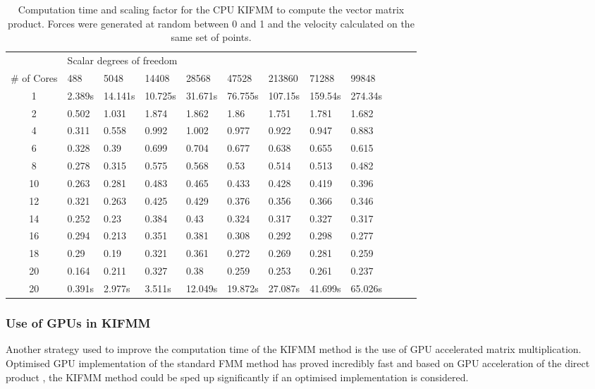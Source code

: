 \begin{table}[ht]
    \centering
    \setlength{\tabcolsep}{6pt}
    \renewcommand{\arraystretch}{1.4}
    \caption[Computation time and scaling factor for the CPU KIFMM to compute the vector matrix product.]{Computation time and scaling factor for the CPU KIFMM to compute the vector matrix product. Forces were generated at random between 0 and 1 and the velocity calculated on the same set of points.}
    \small
    \begin{tabular}{c|lllllllllll}
     & \multicolumn{8}{l}{Scalar degrees of freedom} \\ \cline{2-9}
    \# of Cores & 488 & 5048 & 14408 & 28568 & 47528 & 213860 & 71288 & 99848 \\ \hline
    1 & 2.389s & 14.141s & 10.725s & 31.671s & 76.755s & 107.15s & 159.54s & 274.34s \\ \hline
    2 & 0.502 & 1.031 & 1.874 & 1.862 & 1.86 & 1.751 & 1.781 & 1.682 \\
    4 & 0.311 & 0.558 & 0.992 & 1.002 & 0.977 & 0.922 & 0.947 & 0.883 \\
    6 & 0.328 & 0.39 & 0.699 & 0.704 & 0.677 & 0.638 & 0.655 & 0.615 \\
    8 & 0.278 & 0.315 & 0.575 & 0.568 & 0.53 & 0.514 & 0.513 & 0.482 \\
    10 & 0.263 & 0.281 & 0.483 & 0.465 & 0.433 & 0.428 & 0.419 & 0.396 \\
    12 & 0.321 & 0.263 & 0.425 & 0.429 & 0.376 & 0.356 & 0.366 & 0.346 \\
    14 & 0.252 & 0.23 & 0.384 & 0.43 & 0.324 & 0.317 & 0.327 & 0.317 \\
    16 & 0.294 & 0.213 & 0.351 & 0.381 & 0.308 & 0.292 & 0.298 & 0.277 \\
    18 & 0.29 & 0.19 & 0.321 & 0.361 & 0.272 & 0.269 & 0.281 & 0.259 \\
    20 & 0.164 & 0.211 & 0.327 & 0.38 & 0.259 & 0.253 & 0.261 & 0.237 \\ \hline
    20 & 0.391s & 2.977s & 3.511s & 12.049s & 19.872s & 27.087s & 41.699s & 65.026s \\
    \end{tabular}
    \label{tab:CPUparalisation}
\end{table}

\subsubsection{Use of GPUs in KIFMM}
Another strategy used to improve the computation time of the KIFMM method is the use of GPU accelerated matrix multiplication. Optimised GPU implementation of the standard FMM method\cite{Yokota,Hamada200942Turbulence,Wilson2021ATraversal,Kohnke2020AAccuracy} has proved incredibly fast and based on GPU acceleration of the direct product \cite{Gallagher2020}, the KIFMM method could be sped up significantly if an optimised implementation is considered.

